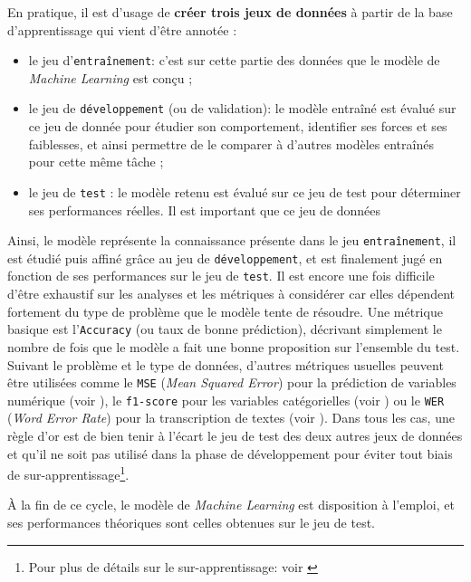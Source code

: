 			En pratique, il est d'usage de \textbf{créer trois jeux de données} à partir de la base d'apprentissage qui vient d'être annotée :
			\begin{itemize}
				\item le jeu d'\texttt{entraînement}: c'est sur cette partie des données que le modèle de \textit{Machine Learning} est conçu ;
				\item le jeu de \texttt{développement} (ou de validation): le modèle entraîné est évalué sur ce jeu de donnée pour étudier son comportement, identifier ses forces et ses faiblesses, et ainsi permettre de le comparer à d'autres modèles entraînés pour cette même tâche ;
				\item le jeu de \texttt{test} : le modèle retenu est évalué sur ce jeu de test pour déterminer ses performances réelles. Il est important que ce jeu de données 
			\end{itemize}
			
			Ainsi, le modèle représente la connaissance présente dans le jeu \texttt{entraînement}, il est étudié puis affiné grâce au jeu de \texttt{développement}, et est finalement jugé en fonction de ses performances sur le jeu de \texttt{test}.
			Il est encore une fois difficile d'être exhaustif sur les analyses et les métriques à considérer car elles dépendent fortement du type de problème que le modèle tente de résoudre.
			Une métrique basique est l'\texttt{Accuracy} (ou taux de bonne prédiction), décrivant simplement le nombre de fois que le modèle a fait une bonne proposition sur l'ensemble du test.
			Suivant le problème et le type de données, d'autres métriques usuelles peuvent être utilisées comme le \texttt{MSE} (\textit{Mean Squared Error}) pour la prédiction de variables numérique (voir \cite{wallach-goffinet:1987:mean-squared-error}), le \texttt{f1-score} pour les variables catégorielles (voir \cite{sasaki:2007:truth-fmeasure}) ou le \texttt{WER} (\textit{Word Error Rate}) pour la transcription de textes (voir \cite{mccowan-etal:2005:use-information-retrieval}).
			Dans tous les cas, une règle d'or est de bien tenir à l'écart le jeu de test des deux autres jeux de données et qu'il ne soit pas utilisé dans la phase de développement pour éviter tout biais de sur-apprentissage\footnote{Pour plus de détails sur le sur-apprentissage: voir \cite{collins:2017:chapter-overfitting}}.

			À la fin de ce cycle, le modèle de \textit{Machine Learning} est disposition à l'emploi, et ses performances théoriques sont celles obtenues sur le jeu de test.
		
